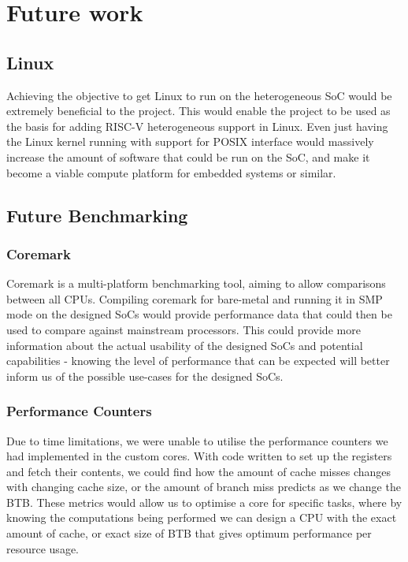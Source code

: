 \section{Future work}
\subsection{Linux}
Achieving the objective to get Linux to run on the heterogeneous SoC would be extremely beneficial to the project. This would enable the project to be used as the basis for adding RISC-V heterogeneous support in Linux. Even just having the Linux kernel running with support for POSIX interface would massively increase the amount of software that could be run on the SoC, and make it become a viable compute platform for embedded systems or similar.

\subsection{Future Benchmarking}
\subsubsection{Coremark}
Coremark\cite{coremark} is a multi-platform benchmarking tool, aiming to allow comparisons between all CPUs. Compiling coremark for bare-metal and running it in SMP mode on the designed SoCs would provide performance data that could then be used to compare against mainstream processors. This could provide more information about the actual usability of the designed SoCs and potential capabilities - knowing the level of performance that can be expected will better inform us of the possible use-cases for the designed SoCs.

\subsubsection{Performance Counters}
Due to time limitations, we were unable to utilise the performance counters we had implemented in the custom cores. With code written to set up the registers and fetch their contents, we could find how the amount of cache misses changes with changing cache size, or the amount of branch miss predicts as we change the BTB. These metrics would allow us to optimise a core for specific tasks, where by knowing the computations being performed we can design a CPU with the exact amount of cache, or exact size of BTB that gives optimum performance per resource usage. 

